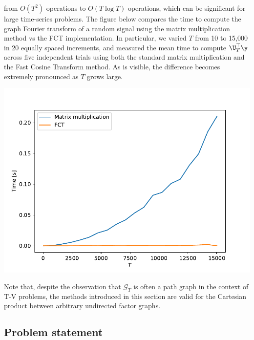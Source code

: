 {    from $O(T^2)$ operations to $O(T \log T)$ operations, which can be significant for large time-series problems. The figure below compares the time to compute the graph Fourier transform of a random signal using the matrix multiplication method vs the FCT implementation. In particular, we varied $T$ from 10 to 15,000 in 20 equally spaced increments, and measured the mean time to compute $\U_T^\top \y$ across five independent trials using both the standard matrix multiplication and the Fast Cosine Transform method. As is visible, the difference becomes extremely pronounced as $T$ grows large.

    \begin{center}
        \includegraphics[width=0.9\linewidth]{Figures/DCT.pdf}
    \end{center}



}



Note that, despite the observation that $\mathcal{G}_T$ is often a path graph in the context of T-V problems, the methods introduced in this section are valid for the Cartesian product between arbitrary undirected factor graphs.

\subsection{Problem statement}

